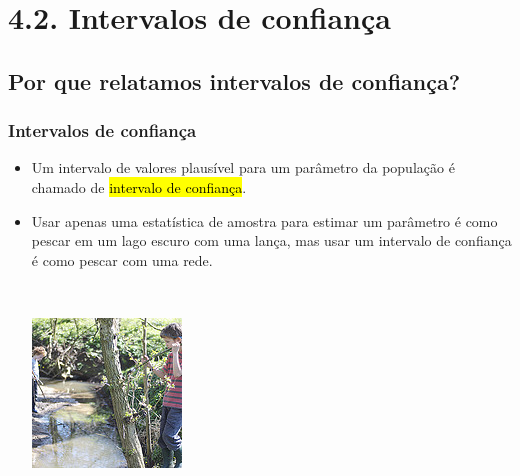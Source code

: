 
\section{4.2. Intervalos de confiança}


\subsection{Por que relatamos intervalos de confiança?}


\begin{frame}
\frametitle{Intervalos de confiança}
\footnotesize
\begin{itemize}
\justifying
\item Um intervalo de valores plausível para um parâmetro da população é chamado de \hl{intervalo de confiança}.
\justifying
\item Usar apenas uma estatística de amostra para estimar um parâmetro é como pescar em um lago escuro com uma lança, mas usar um intervalo de confiança é como pescar com uma rede.
$\:$ \\
$\:$ \\
\begin{columns}[c]
\includegraphics[width=\textwidth]{4-2_conf_int/spear.jpg}

\end{columns}
\end{itemize}
\end{frame}
